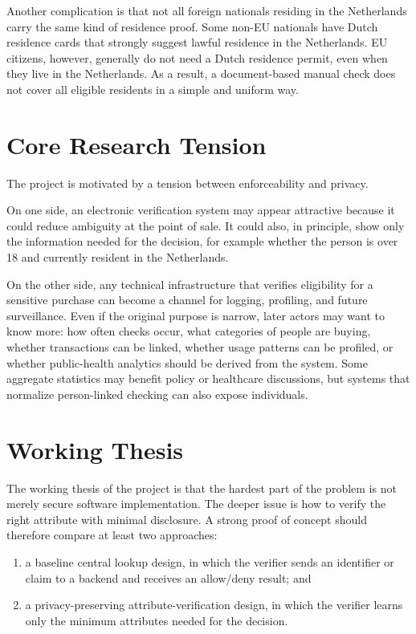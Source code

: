 \documentclass[11pt,a4paper]{article}
\begin{document}
Another complication is that not all foreign nationals residing in the Netherlands carry the same kind of residence proof. Some non-EU nationals have Dutch residence cards that strongly suggest lawful residence in the Netherlands. EU citizens, however, generally do not need a Dutch residence permit, even when they live in the Netherlands. As a result, a document-based manual check does not cover all eligible residents in a simple and uniform way.

\section{Core Research Tension}

The project is motivated by a tension between enforceability and privacy.

On one side, an electronic verification system may appear attractive because it could reduce ambiguity at the point of sale. It could also, in principle, show only the information needed for the decision, for example whether the person is over 18 and currently resident in the Netherlands.

On the other side, any technical infrastructure that verifies eligibility for a sensitive purchase can become a channel for logging, profiling, and future surveillance. Even if the original purpose is narrow, later actors may want to know more: how often checks occur, what categories of people are buying, whether transactions can be linked, whether usage patterns can be profiled, or whether public-health analytics should be derived from the system. Some aggregate statistics may benefit policy or healthcare discussions, but systems that normalize person-linked checking can also expose individuals.

\section{Working Thesis}

The working thesis of the project is that the hardest part of the problem is not merely secure software implementation. The deeper issue is how to verify the right attribute with minimal disclosure. A strong proof of concept should therefore compare at least two approaches:

\begin{enumerate}[label=\arabic*.]
    \item a baseline central lookup design, in which the verifier sends an identifier or claim to a backend and receives an allow/deny result; and
    \item a privacy-preserving attribute-verification design, in which the verifier learns only the minimum attributes needed for the decision.
\end{enumerate}
\end{document}
